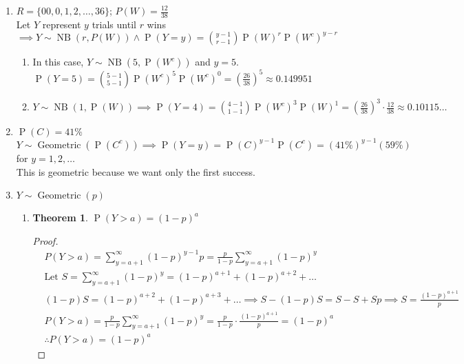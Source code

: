 \documentclass{article}
\title{\MakeUppercase{\jobname}}
\author{Justin Nguyen}
\date{\today}
\newcommand{\Let}[0]{\textrm{Let }}
\newcommand{\set}[1]{\{#1\}}
\newcommand{\pr}[1]{\operatorname{P}(#1)}
\newcommand{\geodist}[2]{#1 \sim \operatorname{Geometric}(#2)}
\newcommand{\nbinomdist}[3]{#1 \sim \operatorname{NB}(#2, #3)}
\newtheorem*{theorem}{Theorem}
\begin{document}
\maketitle

\begin{enumerate}
  \item $R = \set{00,0,1,2,\ldots,36}$; $P(W) = \frac{12}{38}$\\
  Let $Y$ represent $y$ trials until $r$ wins $\implies \nbinomdist{Y}{r}{P(W)} 
  \wedge \pr{Y=y} = \binom{y-1}{r-1}\pr{W}^r\pr{W^c}^{y-r}$
  \begin{enumerate}
    \item In this case, $\nbinomdist{Y}{5}{\pr{W^c}}$ and $y = 5$.\\
    $\pr{Y=5}=\binom{5-1}{5-1}\pr{W^c}^{5}\pr{W^c}^0 = (\frac{26}{38})^5 \approx 0.149951$
    \item $\nbinomdist{Y}{1}{\pr{W}} \implies 
    \pr{Y=4} = \binom{4-1}{1-1}\pr{W^c}^{3}\pr{W}^{1} = (\frac{26}{38})^3\cdot\frac{12}{38} \approx 0.10115\ldots$
  \end{enumerate}
  
  \item $\pr{C} = 41\%$\\
  $\geodist{Y}{\pr{C^c}} \implies \pr{Y=y} = \pr{C}^{y-1}\pr{C^c} = (41\%)^{y-1}(59\%)$ for $y = 1,2,\ldots$\\
  This is geometric because we want only the first success.

  \item $\geodist{Y}{p}$
  \begin{enumerate}
    \item \begin{theorem}
      $\pr{Y > a} = (1-p)^a$
    \end{theorem}
    \begin{proof}
      \begin{align*}
        & P(Y > a) = \sum_{y=a+1}^{\infty}(1-p)^{y-1}p 
        = \frac{p}{1-p}\sum_{y=a+1}^{\infty}(1-p)^{y}\\
        & \Let S = \sum_{y=a+1}^{\infty}(1-p)^{y} = (1-p)^{a+1} + (1-p)^{a+2} + \ldots\\
        & (1-p)S = (1-p)^{a+2} + (1-p)^{a+3} + \ldots \implies S-(1-p)S = S-S+Sp \implies S = \frac{(1-p)^{a+1}}{p}\\
        & P(Y > a) = \frac{p}{1-p}\sum_{y=a+1}^{\infty}(1-p)^{y} = \frac{p}{1-p}\cdot \frac{(1-p)^{a+1}}{p} = (1-p)^{a}\\
        & \therefore P(Y > a) = (1-p)^{a}
      \end{align*}
    \end{proof}
    

\end{enumerate}
\end{enumerate}
\end{document}
